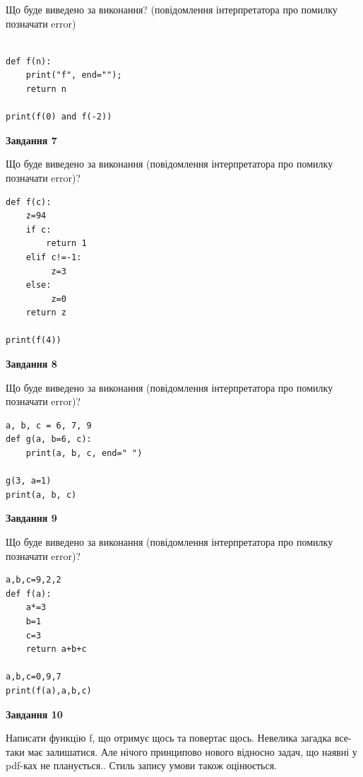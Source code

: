 \documentclass[12pt, ukrainian]{article}
\begin{document}
{\begin {large}
Що буде виведено за виконання? (повідомлення інтерпретатора про помилку позначати error)\par
\begin{verbatim}

def f(n):
    print("f", end="");
    return n

print(f(0) and f(-2))
\end{verbatim}

{\begin {center}\textbf{Завдання 7}\end {center}}

Що буде виведено за виконання (повідомлення інтерпретатора про помилку позначати error)?\par
\begin{verbatim}
def f(c):
    z=94
    if c: 
        return 1
    elif c!=-1:
         z=3
    else:
         z=0
    return z

print(f(4))
\end{verbatim}

{\begin {center}\textbf{Завдання 8}\end {center}}

Що буде виведено за виконання (повідомлення інтерпретатора про помилку позначати error)?\par
\begin{verbatim}
a, b, c = 6, 7, 9
def g(a, b=6, c):
    print(a, b, c, end=" ")

g(3, a=1)
print(a, b, c)
\end{verbatim}

{\begin {center}\textbf{Завдання 9}\end {center}}

Що буде виведено за виконання (повідомлення інтерпретатора про помилку позначати error)?\par
\begin{verbatim}
a,b,c=9,2,2
def f(a):
    a*=3
    b=1
    c=3
    return a+b+c

a,b,c=0,9,7
print(f(a),a,b,c)
\end{verbatim}

{\begin {center}\textbf{Завдання 10}\end {center}}


Написати функцiю f, що отримує щось та повертає щось. Невелика загадка все-таки має залишатися. Але нічого принципово нового відносно задач, що наявні у pdf-ках не планується.. Стиль запису умови також оцінюється.\par
\end {large}}
\newpage
\end{document}
